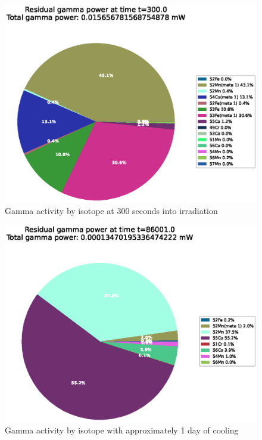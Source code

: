 \begin{figure}[!htb]
\centering
\includegraphics[width=0.8\linewidth]{chapters/activity_code/fe-activity-v2/residual-energy/0100_300.eps}
\caption{Gamma activity by isotope at 300 seconds into irradiation}
\label{fig:activity-v2-residual-power-300s}
\end{figure}

\begin{figure}[!htb]
\centering
\includegraphics[width=0.8\linewidth]{chapters/activity_code/fe-activity-v2/residual-energy/0166_86001.eps}
\caption{Gamma activity by isotope with approximately 1 day of cooling}
\label{fig:activity-v2-residual-power-86001s}
\end{figure}

